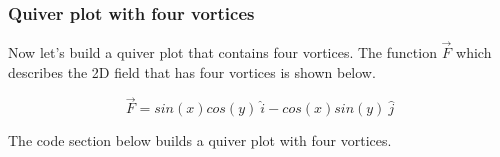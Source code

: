 \documentclass{book}
\begin{document}
    \begin{center}
    \end{center}
    { \hspace*{\fill} \\}
    

    
        \hypertarget{quiver-plot-with-four-vortices}{%
\subsubsection{Quiver plot with four
vortices}\label{quiver-plot-with-four-vortices}}

Now let's build a quiver plot that contains four vortices. The function
\(\vec{F}\) which describes the 2D field that has four vortices is shown
below.

\[ \vec{F} = sin(x)cos(y) \ \hat{i} -cos(x)sin(y) \ \hat{j} \]

The code section below builds a quiver plot with four vortices.
    
\end{document}
